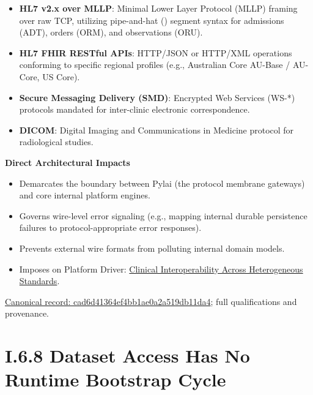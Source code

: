 \begin{itemize}


\item \textbf{HL7 v2.x over MLLP}: Minimal Lower Layer Protocol (MLLP) framing over raw TCP, utilizing pipe-and-hat (\texttt{}) segment syntax for admissions (ADT), orders (ORM), and observations (ORU).

\item \textbf{HL7 FHIR RESTful APIs}: HTTP/JSON or HTTP/XML operations conforming to specific regional profiles (e.g., Australian Core AU-Base / AU-Core, US Core).

\item \textbf{Secure Messaging Delivery (SMD)}: Encrypted Web Services (WS-*) protocols mandated for inter-clinic electronic correspondence.

\item \textbf{DICOM}: Digital Imaging and Communications in Medicine protocol for radiological studies.

\end{itemize}


\par\medskip\textbf{Direct Architectural Impacts}\par


\begin{itemize}


\item Demarcates the boundary between Pylai (the protocol membrane gateways) and core internal platform engines.

\item Governs wire-level error signaling (e.g., mapping internal durable persistence failures to protocol-appropriate error responses).

\item Prevents external wire formats from polluting internal domain models.

\item Imposes on Platform Driver: \href{\detokenize{../../../../../docs/markdown/01-motivation/drivers-assessments/drivers.md}}{Clinical Interoperability Across Heterogeneous Standards}.

\end{itemize}

{\footnotesize \href{../../../../continuum/motivation/constraint/cad6d41364ef4bb1ae0a2a519db11da4.md}{Canonical record: cad6d41364ef4bb1ae0a2a519db11da4}; full qualifications and provenance.}\par
\section*{I.6.8 Dataset Access Has No Runtime Bootstrap Cycle}
\label{navigation:I.6.8}

